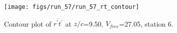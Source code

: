 \begin{figure}[H]
\centering
\texttt{[image: figs/run\_57/run\_57\_rt\_contour]}
\caption{Contour plot of $\overline{r^\prime t^\prime}$ at $z/c$=9.50, $V_{free}$=27.05, station 6.}
\label{fig:run_57_rt_contour}
\end{figure}


